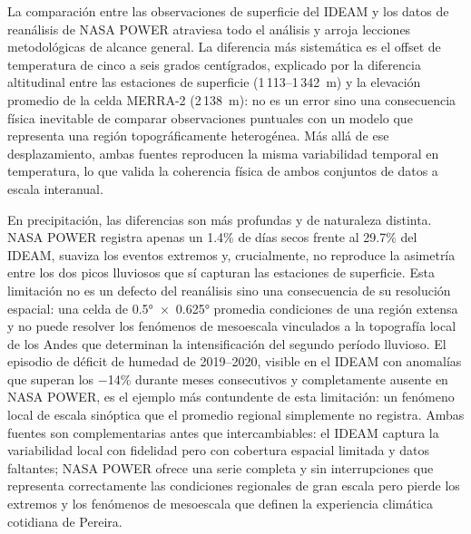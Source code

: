 \documentclass[12pt, a4paper]{article}
\begin{document}
La comparación entre las observaciones de superficie del IDEAM y los datos de
reanálisis de NASA POWER atraviesa todo el análisis y arroja lecciones metodológicas
de alcance general. La diferencia más sistemática es el offset de temperatura de
cinco a seis grados centígrados, explicado por la diferencia altitudinal entre las
estaciones de superficie (1\,113--1\,342~m) y la elevación promedio de la celda
MERRA-2 (2\,138~m): no es un error sino una consecuencia física inevitable de
comparar observaciones puntuales con un modelo que representa una región topográficamente
heterogénea. Más allá de ese desplazamiento, ambas fuentes reproducen la misma
variabilidad temporal en temperatura, lo que valida la coherencia física de ambos
conjuntos de datos a escala interanual.

En precipitación, las diferencias son más profundas y de naturaleza distinta. NASA
POWER registra apenas un 1.4\% de días secos frente al 29.7\% del IDEAM, suaviza
los eventos extremos y, crucialmente, no reproduce la asimetría entre los dos picos
lluviosos que sí capturan las estaciones de superficie. Esta limitación no es un
defecto del reanálisis sino una consecuencia de su resolución espacial: una celda
de 0.5°~$\times$~0.625° promedia condiciones de una región extensa y no puede
resolver los fenómenos de mesoescala vinculados a la topografía local de los Andes
que determinan la intensificación del segundo período lluvioso. El episodio de
déficit de humedad de 2019--2020, visible en el IDEAM con anomalías que superan
los $-$14\% durante meses consecutivos y completamente ausente en NASA POWER,
es el ejemplo más contundente de esta limitación: un fenómeno local de escala
sinóptica que el promedio regional simplemente no registra. Ambas fuentes son
complementarias antes que intercambiables: el IDEAM captura la variabilidad local
con fidelidad pero con cobertura espacial limitada y datos faltantes; NASA POWER
ofrece una serie completa y sin interrupciones que representa correctamente las
condiciones regionales de gran escala pero pierde los extremos y los fenómenos
de mesoescala que definen la experiencia climática cotidiana de Pereira.
	\newpage
	
\end{document}
